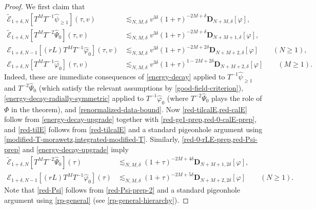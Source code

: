 \documentclass[10pt, reqno]{amsart}
\begin{document}
\begin{proof}
We first claim that
\begin{align}
\tilde{\mathcal{E}}_{1+\delta{},N}[T^MT^{-1}\widehat{\psi{}}_{\ge 1}](\tau{},v) &\lesssim_{N,M,\delta{}} v^{3\delta{}}(1+\tau{})^{-2M+\delta{}}\mathbf{D}_{N+M,\delta{}}[\varphi{}], \label{red-ge1-prep} \\
\tilde{\mathcal{E}}_{1+\delta{},N}[T^MT^{-2}\widehat{\Psi{}}_0](\tau{},v) &\lesssim_{N,M,\delta{}} v^{3\delta{}}(1+\tau{})^{-2M+\delta{}}\mathbf{D}_{N+M+1,\delta{}}[\varphi{}], \label{red-Psi-prep} \\
\mathcal{E}_{1+\delta{},N-1}[(rL)T^MT^{-1}\widehat{\varphi{}}_0](\tau{},v) &\lesssim_{N,M,\delta{}} v^{3\delta{}}(1+\tau{})^{-2M+2\delta{}}\mathbf{D}_{N+M+2,\delta{}}[\varphi{}]\qquad (N\ge 1),\label{red-0-rLE-prep} \\
\mathcal{E}_{1+\delta{},N}[T^MT^{-1}\widehat{\varphi{}}_0](\tau{},v) &\lesssim_{N,M,\delta{}} v^{3\delta{}}(1+\tau{})^{1-2M+2\delta{}}\mathbf{D}_{N+M+2,\delta{}}[\varphi{}]\qquad (M\ge 1). \label{red-0-calE-prep}
\end{align}
Indeed, these are immediate consequences of \cref{energy-decay} applied to
\(T^{-1}\widehat{\psi{}}_{\ge 1}\) and \(T^{-2}\widehat{\Psi{}}_0\) (which
satisfy the relevant assumptions by \cref{good-field-criterion}),
\cref{energy-decay-radially-symmetric} applied to \(T^{-1}\widehat{\varphi{}}_0\) (where
\(T^{-2}\widehat{\Psi{}}_0\) plays the role of \(\Phi{}\) in the theorem), and
\cref{renormalized-data-bound}. Now \cref{red-tilcalE,red-calE} follow from
\cref{energy-decay-upgrade} together with \cref{red-ge1-prep,red-0-calE-prep}, and
\cref{red-tilE} follows from \cref{red-tilcalE} and a standard pigeonhole argument
using \cref{modified-T-morawetz,integrated-modified-T}. Similarly, \cref{red-0-rLE-prep,red-Psi-prep} and
\cref{energy-decay-upgrade} imply
\begin{align}
\tilde{\mathcal{E}}_{1+\delta{},N}[T^MT^{-2}\widehat{\Psi{}}_0](\tau{}) &\lesssim_{N,M,\delta{}} (1+\tau{})^{-2M+4\delta{}}\mathbf{D}_{N+M+1,2\delta{}}[\varphi{}], \label{red-Psi-prep-2} \\
\mathcal{E}_{1+\delta{},N-1}[(rL)T^MT^{-1}\widehat{\varphi{}}_0](\tau{}) &\lesssim_{N,M,\delta{}} (1+\tau{})^{-2M+5\delta{}}\mathbf{D}_{N+M+2,2\delta{}}[\varphi{}]\qquad (N\ge 1). \label{red-rL-prep}
\end{align}
Note that \cref{red-Psi} follows from \cref{red-Psi-prep-2} and a standard pigeonhole
argument using \cref{rp-general} (see \cref{rp-general-hierarchy}).


\end{proof}
\end{document}
